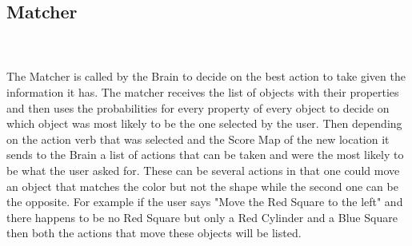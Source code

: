 \documentclass{article}
\begin{document}
    
     \subsection{Matcher}
     \\\\
     The Matcher is called by the Brain to decide on the best action to take given the information it has. The matcher receives the list of objects with their properties and then uses the probabilities for every property of every object to decide on which object was most likely to be the one selected by the user. Then depending on the action verb that was selected and the Score Map of the new location it sends to the Brain a list of actions that can be taken and were the most likely to be what the user asked for. These can be several actions in that one could move an object that matches the color but not the shape while the second one can be the opposite. For example if the user says "Move the Red Square to the left" and there happens to be no Red Square but only a Red Cylinder and a Blue Square then both the actions that move these objects will be listed.
	
\end{document}
